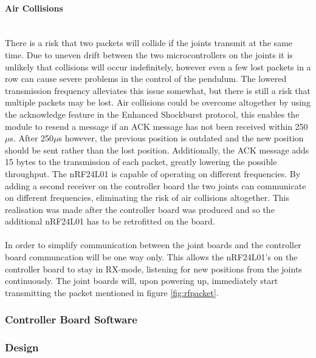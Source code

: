 {\paragraph{Air Collisions}~\\ %
\label{par:air_collisions}
There is a risk that two packets will collide if the joints transmit at the same time.
Due to uneven drift between the two microcontrollers on the joints it is unlikely that collisions will occur indefinitely, however even a few lost packets in a row can cause severe problems in the control of the pendulum.
The lowered transmission frequency alleviates this issue somewhat, but there is still a risk that multiple packets may be lost.
Air collisions could be overcome altogether by using the acknowledge feature in the Enhanced Shockburst protocol, this enables the module to resend a message if an ACK message has not been received within 250$\mu$s.
After 250$\mu$s however, the previous position is outdated and the new position should be sent rather than the lost position.
Additionally, the ACK message adds 15 bytes to the transmission of each packet, greatly lowering the possible throughput.
The nRF24L01 is capable of operating on different frequencies.
By adding a second receiver on the controller board the two joints can communicate on different frequencies, eliminating the risk of air collisions altogether.
This realisation was made after the controller board was produced and so the additional nRF24L01 has to be retrofitted on the board. 
\\~\\
In order to simplify communication between the joint boards and the controller board communcation will be one way only.
This allows the nRF24L01's on the controller board to stay in RX-mode, listening for new positions from the joints continuously.
The joint boards will, upon powering up, immediately start transmitting the packet mentioned in figure \ref{fig:rfpacket}.

\subsubsection{Controller Board Software} %
\label{ssub:controller_board_software}

\subsubsection{Design} %
\label{ssub:design}

}
